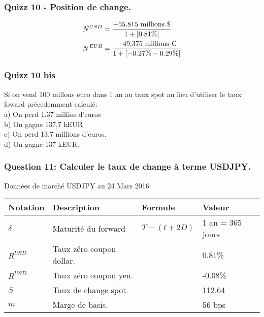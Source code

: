 \documentclass{beamer}
\begin{document}
\begin{frame}
\frametitle{Quizz 10 - Position de change.}
\Large
\[
\begin{split}
N^{USD}&=\frac{-55.815 \text{ millions \$}}{1+[0.81\%]}\\
N^{EUR}&=\frac{+49.375 \text{ millions \texteuro}}{1+[-0.27\%-0.29\%]}\\
\end{split}
\]
\end{frame}

\begin{frame}
\frametitle{Quizz 10 bis}
Si on vend 100 millons euro dans 1 an au taux spot au lieu d'utiliser le taux foward précedemment calculé:\\
\vspace{0.5cm}
a) On perd 1.37 millios d'euros \\
b) On gagne 137,7 kEUR \\
c) On perd 13.7 millions d'euros. \\
d) On gagne 137 kEUR. \\
\vspace{0.5cm}
\end{frame}

\begin{frame}
\small
\frametitle{Question 11: Calculer le taux de change à terme USDJPY.}
Données de marché USDJPY au 24 Mars 2016:\\
\begin{center}
\begin{tabular}{|l|l|l|l|}
\hline
\textbf{Notation} & \textbf{Description} & \textbf{Formule} & \textbf{Valeur} \\
\hline
\hline
$\delta$ & Maturité du forward & $T-(t+2D)$ & 1 an = 365 jours \\
$R^{USD}$ & Taux zéro coupon dollar. &  & 0.81\% \\
$R^{USD}$ & Taux zéro coupon yen. &  & -0.08\% \\
$S$ & Taux de change spot. &  & 112.64 \\
$m$ & Marge de basis. &  & 56 bps \\
\hline
\end{tabular}
\end{center}
\end{frame}
\end{document}
